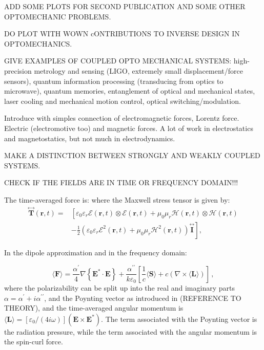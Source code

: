 ADD SOME PLOTS FOR SECOND PUBLICATION AND SOME OTHER OPTOMECHANIC PROBLEMS.

DO PLOT WITH WOWN cONTRIBUTIONS TO INVERSE DESIGN IN OPTOMECHANICS.

GIVE EXAMPLES OF COUPLED OPTO MECHANICAL SYSTEMS: high-precision metrology and sensing (LIGO, extremely small displacement/force sensors),
quantum information processing (transducing from optics to microwave), quantum memories, 
entanglement of optical and mechanical states, laser cooling and mechanical motion control,
optical switching/modulation.

Introduce with simples connection of electromagnetic forces, Lorentz force. Electric (electromotive too) and 
magnetic forces. A lot of work in electrostatics and magnetostatics, but not much in
electrodynamics.

MAKE A DISTINCTION BETWEEN STRONGLY AND WEAKLY COUPLED SYSTEMS.

CHECK IF THE FIELDS ARE IN TIME OR FREQUENCY DOMAIN!!!

The time-averaged force is:
where the Maxwell stress tensor is given by:
\begin{equation}
    \begin{aligned}
    \stackrel{\leftrightarrow}{\mathbf{T}}(\mathbf{r}, t)= & {\left[\varepsilon_0 \varepsilon_r \mathcal{E}(\mathbf{r}, t) \otimes \mathcal{E}(\mathbf{r}, t)+\mu_0 \mu_r \mathcal{H}(\mathbf{r}, t) \otimes \mathcal{H}(\mathbf{r}, t)\right.} \\
    & \left.-\frac{1}{2}\left(\varepsilon_0 \varepsilon_r \mathcal{E}^2(\mathbf{r}, t)+\mu_0 \mu_r \mathcal{H}^2(\mathbf{r}, t)\right) \stackrel{\leftrightarrow}{\mathbf{I}}\right],
    \end{aligned}
\end{equation}

In the dipole approximation and in the frequency domain:

\begin{equation}
    \langle\mathbf{F}\rangle=\frac{\alpha^{\prime}}{4} \nabla\left\{\mathbf{E}^* \cdot \mathbf{E}\right\}
    +\frac{\alpha^{\prime \prime}}{k \varepsilon_0} \left[\frac{1}{c}\langle \mathbf{S} \rangle + c \left( \nabla \times \langle \mathbf{L} \rangle \right)\right]\,,
\end{equation}
where the polarizability can be split up into the real and imaginary parts 
$\alpha=\alpha^\prime + i \alpha^{\prime \prime}$, and the Poynting vector as introduced in 
(REFERENCE TO THEORY), and the time-averaged angular momentum is 
$\langle \mathbf{L} \rangle = [\varepsilon_0/(4 i \omega)](\mathbf{E} \times \mathbf{E}^*)$. 
The term associated with the Poynting vector is the radiation pressure, while the term associated 
with the angular momentum is the spin-curl force.

